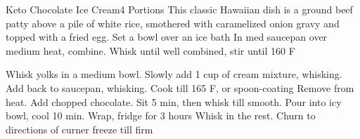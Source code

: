 \documentclass[a6paper,landscape]{article}
\begin{document}
\begin{recipe}{Keto Chocolate Ice Cream}{4 Portions}{}
  \freeform This classic Hawaiian dish is a ground beef patty above a pile of white rice, smothered with caramelized onion gravy and topped with a fried egg.
  Set a bowl over an ice bath
  \newstep
  In med saucepan over medium heat, combine. Whisk until well combined, stir until 160 F

  Whisk yolks in a medium bowl. Slowly add 1 cup of cream mixture, whisking. Add back to saucepan, whisking. Cook till 165 F, or spoon-coating
  Remove from heat. Add chopped chocolate. Sit 5 min, then whisk till smooth.
  \newstep
  Pour into icy bowl, cool 10 min. Wrap, fridge for 3 hours
  Whisk in the rest. 
  \newstep
  Churn to directions of curner
  \newstep
  freeze till firm
  \end{recipe}
\end{document}
